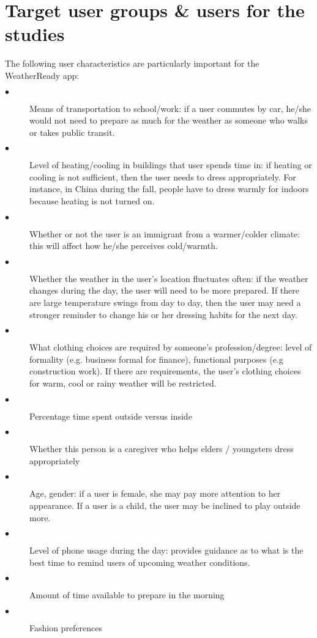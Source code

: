 \documentclass{sigchi}
\begin{document}
\section{Target user groups \& users for the studies}

The following user characteristics are particularly important for the WeatherReady app:

\begin{description}


\item[$\bullet$] Means of transportation to school/work: if a user commutes by car, he/she would not need to prepare as much for the weather as someone who walks or takes public transit.

\item[$\bullet$] Level of heating/cooling in buildings that user spends time in: if heating or cooling is not sufficient, then the user needs to dress appropriately. For instance, in China during the fall, people have to dress warmly for indoors because heating is not turned on.
\item[$\bullet$] Whether or not the user is an immigrant from a warmer/colder climate: this will affect how he/she perceives cold/warmth.
\item[$\bullet$] Whether the weather in the user's location fluctuates often: if the weather changes during the day, the user will need to be more prepared. If there are large temperature swings from day to day, then the user may need a stronger reminder to change his or her dressing habits for the next day.
\item[$\bullet$]What clothing choices are required by someone's profession/degree: level of formality (e.g. business formal for finance), functional purposes (e.g construction work). If there are requirements, the user's clothing choices for warm, cool or rainy weather will be restricted.
\item[$\bullet$]Percentage time spent outside versus inside
\item[$\bullet$]Whether this person is a caregiver who helps elders / youngsters dress appropriately
\item[$\bullet$]Age, gender: if a user is female, she may pay more attention to her appearance. If a user is a child, the user may be inclined to play outside more.
\item[$\bullet$]Level of phone usage during the day: provides guidance as to what is the best time to remind users of upcoming weather conditions.
\item[$\bullet$]Amount of time available to prepare in the morning
\item[$\bullet$]Fashion preferences

\end{description}
\end{document}
